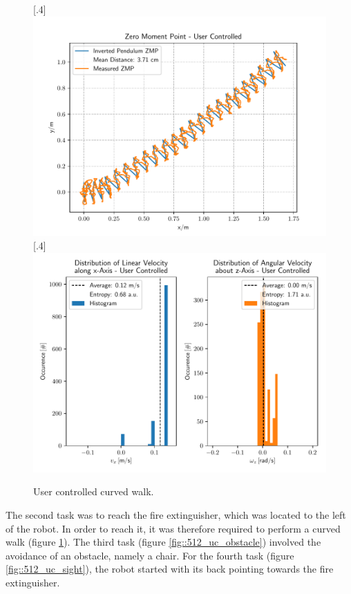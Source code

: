 \begin{figure}[h!]
	\centering
	[.4\linewidth]{\includegraphics[scale=.35]{chapters/05_experiments/01_user_controlled_walking/02_test_environment/curved_walk_01_zmp.pdf}}
	[.4\linewidth]{\includegraphics[scale=.35]{chapters/05_experiments/01_user_controlled_walking/02_test_environment/curved_walk_01_entropy.pdf}}
	\caption{User controlled curved walk.}
	\label{fig::512_uc_curved}
\end{figure} 
The second task was to reach the fire extinguisher, which was located to the left of the robot. In order to reach it, it was therefore required to perform a curved walk (figure \ref{fig::512_uc_curved}). The third task (figure \ref{fig::512_uc_obstacle}) involved the avoidance of an obstacle, namely a chair. For the fourth task (figure \ref{fig::512_uc_sight}), the robot started with its back pointing towards the fire extinguisher.
